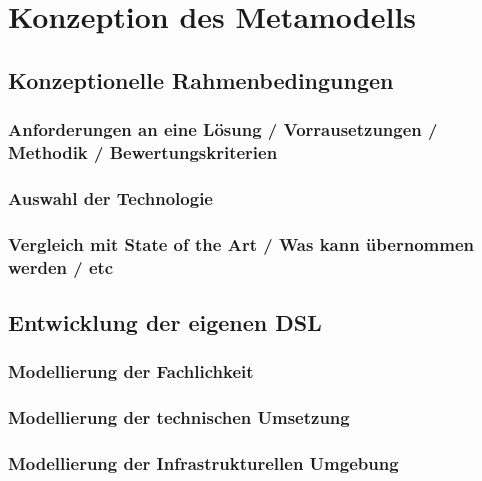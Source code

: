 \chapter{Konzeption des Metamodells}

\section{Konzeptionelle Rahmenbedingungen}

\subsection{Anforderungen an eine Lösung / Vorrausetzungen / Methodik / Bewertungskriterien}

\subsection{Auswahl der Technologie}

\subsection{Vergleich mit State of the Art / Was kann übernommen werden / etc}

\section{Entwicklung der eigenen DSL}

\subsection{Modellierung der Fachlichkeit}
\subsection{Modellierung der technischen Umsetzung}
\subsection{Modellierung der Infrastrukturellen Umgebung}
